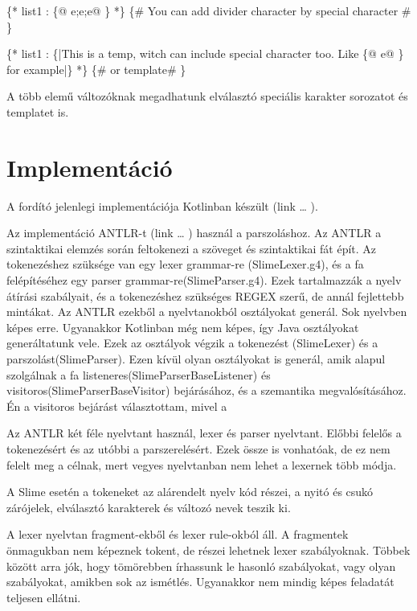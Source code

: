 \{* list1 : \{@ e;e;e@ \} *\} \{\# You can add divider character by special character \#  \}

\{* list1 : \{|This is a temp, witch can include special character too. Like \{@ e@ \} for example|\} *\} \{\# or template\# \}

A több elemű változóknak megadhatunk elválasztó speciális karakter sorozatot és templatet is.


\section{Implementáció}
A fordító jelenlegi implementációja Kotlinban készült (link … ).

Az implementáció ANTLR-t (link … ) használ a parszoláshoz. Az ANTLR a szintaktikai elemzés során feltokenezi a szöveget és szintaktikai fát épít. Az tokenezéshez szüksége van egy lexer grammar-re (SlimeLexer.g4), és a fa felépítéséhez egy parser grammar-re(SlimeParser.g4). Ezek tartalmazzák a nyelv átírási szabályait, és a tokenezéshez szükséges REGEX szerű, de annál fejlettebb mintákat. Az ANTLR ezekből a nyelvtanokból osztályokat generál. Sok nyelvben képes erre. Ugyanakkor Kotlinban még nem képes, így Java osztályokat generáltatunk vele. Ezek az osztályok végzik a tokenezést (SlimeLexer) és a parszolást(SlimeParser). Ezen kívül olyan osztályokat is generál, amik alapul szolgálnak a fa listeneres(SlimeParserBaseListener) és visitoros(SlimeParserBaseVisitor) bejárásához, és a szemantika megvalósításához. Én a visitoros bejárást választottam, mivel a

Az ANTLR két féle nyelvtant használ, lexer és parser nyelvtant. Előbbi felelős a tokenezésért és az utóbbi a parszerelésért. Ezek össze is vonhatóak, de ez nem felelt meg a célnak, mert vegyes nyelvtanban nem lehet a lexernek több módja.

A Slime esetén a tokeneket az alárendelt nyelv kód részei, a nyitó és csukó zárójelek, elválasztó karakterek és változó nevek teszik ki.

A lexer nyelvtan fragment-ekből és lexer rule-okból áll. A fragmentek önmagukban nem képeznek tokent, de részei lehetnek lexer szabályoknak. Többek között arra jók, hogy tömörebben írhassunk le hasonló szabályokat, vagy olyan szabályokat, amikben sok az ismétlés. Ugyanakkor nem mindig képes feladatát teljesen ellátni.

